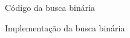\begin{frame}{Código da busca binária}

    \begin{block}{Implementação da busca binária}
        \footnotesize
        \inputminted{cpp}{codigos/busca.binaria.cpp}    
    \end{block}

\end{frame}
